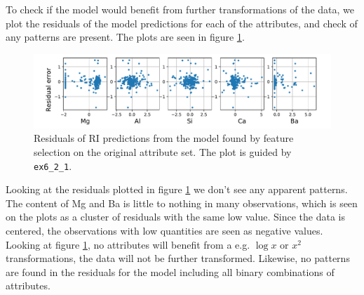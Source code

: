 To check if the model would benefit from further transformations of the data, we plot the residuals of the model predictions for each of the attributes, and check of any patterns are present. The plots are seen in figure \ref{fig:resPrAtt}.

\begin{figure}[H]
    \centering
    \includegraphics[width=\textwidth]{fig/reg_residuals.pdf}
    \caption{Residuals of RI predictions from the model found by feature selection on the original attribute set. The plot is guided by \texttt{ex6\_2\_1}.}
    \label{fig:resPrAtt}
\end{figure}

Looking at the residuals plotted in figure \ref{fig:resPrAtt} we don't see any apparent patterns. The content of Mg and Ba is little to nothing in many observations, which is seen on the plots as a cluster of residuals with the same low value. Since the data is centered, the observations with low quantities are seen as negative values. Looking at figure \ref{fig:resPrAtt}, no attributes will benefit from a e.g. $\log x$ or $x^2$ transformations, the data will not be further transformed. Likewise, no patterns are found in the residuals for the model including all binary combinations of attributes.



